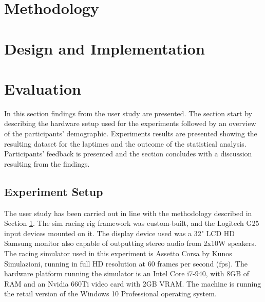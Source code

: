 \documentclass{sig-alternate}
\begin{document}
\section{Methodology}
\label{sec:Methodology}

\section{Design and Implementation}

\section{Evaluation} {
\label{sec:Evaluation}

In this section findings from the user study are presented. The section start by describing the hardware setup used for the experiments followed by an overview of the participants' demographic. Experiments results are presented showing the resulting dataset for the laptimes and the outcome of the statistical analysis. Participants' feedback is presented and the section concludes with a discussion resulting from the findings.

\subsection{Experiment Setup}
The user study has been carried out in line with the methodology described in Section \ref{sec:Methodology}. The sim racing rig framework was custom-built, and the Logitech G25 input devices mounted on it. The display device used was a 32" LCD HD Samsung monitor also capable of outputting stereo audio from 2x10W speakers. The racing simulator used in this experiment is Assetto Corsa by Kunos Simulazioni, running in full HD resolution at 60 frames per second (fps). The hardware platform running the simulator is an Intel Core i7-940, with 8GB of RAM and an Nvidia 660Ti video card with 2GB VRAM. The machine is running the retail version of the Windows 10 Professional operating system.

}
\end{document}
